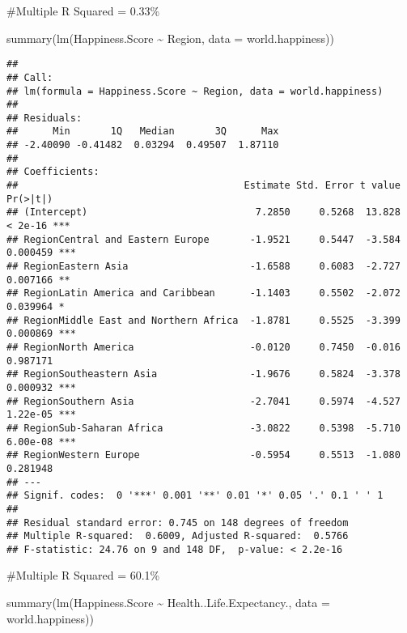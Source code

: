 \documentclass[
]{article}
\newenvironment{Shaded}{\begin{snugshade}}{\end{snugshade}}
\newcommand{\AttributeTok}[1]{\textcolor[rgb]{0.77,0.63,0.00}{#1}}
\newcommand{\FunctionTok}[1]{\textcolor[rgb]{0.00,0.00,0.00}{#1}}
\newcommand{\NormalTok}[1]{#1}
\newcommand{\SpecialCharTok}[1]{\textcolor[rgb]{0.00,0.00,0.00}{#1}}
\begin{document}
\#Multiple R Squared = 0.33\%

\begin{Shaded}
\begin{Highlighting}[]
\FunctionTok{summary}\NormalTok{(}\FunctionTok{lm}\NormalTok{(Happiness.Score }\SpecialCharTok{\textasciitilde{}}\NormalTok{ Region, }\AttributeTok{data =}\NormalTok{ world.happiness))}
\end{Highlighting}
\end{Shaded}

\begin{verbatim}
## 
## Call:
## lm(formula = Happiness.Score ~ Region, data = world.happiness)
## 
## Residuals:
##      Min       1Q   Median       3Q      Max 
## -2.40090 -0.41482  0.03294  0.49507  1.87110 
## 
## Coefficients:
##                                       Estimate Std. Error t value Pr(>|t|)    
## (Intercept)                             7.2850     0.5268  13.828  < 2e-16 ***
## RegionCentral and Eastern Europe       -1.9521     0.5447  -3.584 0.000459 ***
## RegionEastern Asia                     -1.6588     0.6083  -2.727 0.007166 ** 
## RegionLatin America and Caribbean      -1.1403     0.5502  -2.072 0.039964 *  
## RegionMiddle East and Northern Africa  -1.8781     0.5525  -3.399 0.000869 ***
## RegionNorth America                    -0.0120     0.7450  -0.016 0.987171    
## RegionSoutheastern Asia                -1.9676     0.5824  -3.378 0.000932 ***
## RegionSouthern Asia                    -2.7041     0.5974  -4.527 1.22e-05 ***
## RegionSub-Saharan Africa               -3.0822     0.5398  -5.710 6.00e-08 ***
## RegionWestern Europe                   -0.5954     0.5513  -1.080 0.281948    
## ---
## Signif. codes:  0 '***' 0.001 '**' 0.01 '*' 0.05 '.' 0.1 ' ' 1
## 
## Residual standard error: 0.745 on 148 degrees of freedom
## Multiple R-squared:  0.6009, Adjusted R-squared:  0.5766 
## F-statistic: 24.76 on 9 and 148 DF,  p-value: < 2.2e-16
\end{verbatim}

\#Multiple R Squared = 60.1\%

\begin{Shaded}
\begin{Highlighting}[]
\FunctionTok{summary}\NormalTok{(}\FunctionTok{lm}\NormalTok{(Happiness.Score }\SpecialCharTok{\textasciitilde{}}\NormalTok{ Health..Life.Expectancy., }\AttributeTok{data =}\NormalTok{ world.happiness))}
\end{Highlighting}
\end{Shaded}
\end{document}
